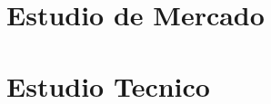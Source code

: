 \documentclass[sn-mathphys]{svmono}
\begin{document}
\chapter{Estudio de Mercado}%
\label{cha:Estudio de Mercado}













\chapter{Estudio Tecnico}







\printbibliography
\end{document}
